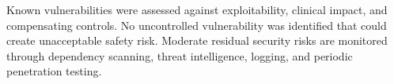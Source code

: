 \begin{keybox}[title={\bfseries Cybersecurity residual-risk conclusion}]
Known vulnerabilities were assessed against exploitability, clinical impact, and compensating controls. No uncontrolled vulnerability was identified that could create unacceptable safety risk. Moderate residual security risks are monitored through dependency scanning, threat intelligence, logging, and periodic penetration testing.
\end{keybox}

